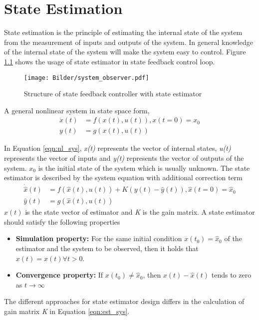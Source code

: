 \chapter{State Estimation}
State estimation is the principle of estimating the internal state of the system from the measurement of inputs and outputs of the system. In general knowledge of the internal state of the system will make the system easy to control. Figure \ref{fig:observer} shows the usage of state estimator in state feedback control loop.
\begin{figure}[h]
  \centering
  \texttt{[image: Bilder/system\_observer.pdf]}
  \caption{Structure of state feedback controller with state estimator}
  \label{fig:observer}
\end{figure}

A general nonlinear system in state space form,
\begin{equation}
\begin{split}
\label{eqn:nl_sys}
\dot{x}(t) &= f(x(t),u(t)) , x(t=0) = x_0 \\
y(t) &= g(x(t),u(t))
\end{split}
\end{equation}

In Equation \ref{eqn:nl_sys}, \emph{x(t)} represents the vector of internal states, \emph{u(t)} represents the vector of inputs and \emph{y(t)} represents the vector of outputs of the system. $x_0$ is the initial state of the system which is usually unknown. 
The state estimator is described by the system equation with additional correction term
\begin{equation}
\begin{split}
\label{eqn:est_sys}
\dot{\hat{x}}(t) &= f(\hat{x}(t),u(t)) + K(y(t)-\hat{y}(t)) , \hat{x}(t=0) = \hat{x}_0\\
\hat{y}(t) &= g(\hat{x}(t),u(t))
\end{split}
\end{equation}
$\hat{x}(t)$ is the state vector of estimator and \emph{K} is the gain matrix.  A state estimator should satisfy the following properties
\begin{itemize}
\item \textbf{Simulation property:} For the same initial condition $x(t_0) = \hat{x}_0$ of the estimator and the system to be observed, then it holds that $x(t) = \hat{x}(t) \forall t > 0 $.
\item \textbf{Convergence property:} If $x(t_0) \neq \hat{x}_0$, then $x(t) - \hat{x}(t)$ tends to zero as $ t \rightarrow \infty $
\end{itemize}

The different approaches for state estimator design differs in the calculation of gain matrix \emph{K} in Equation \ref{eqn:est_sys}.
